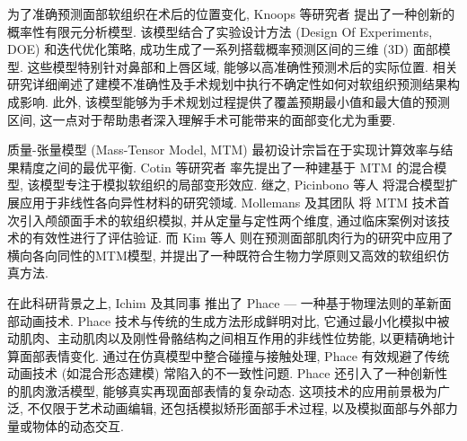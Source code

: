 为了准确预测面部软组织在术后的位置变化, Knoops 等研究者 \cite{knoopsNovelSoftTissue2018} 提出了一种创新的概率性有限元分析模型.
该模型结合了实验设计方法 (Design Of Experiments, DOE) 和迭代优化策略, 成功生成了一系列搭载概率预测区间的三维 (3D) 面部模型.
这些模型特别针对鼻部和上唇区域, 能够以高准确性预测术后的实际位置.
相关研究详细阐述了建模不准确性及手术规划中执行不确定性如何对软组织预测结果构成影响.
此外, 该模型能够为手术规划过程提供了覆盖预期最小值和最大值的预测区间, 这一点对于帮助患者深入理解手术可能带来的面部变化尤为重要.

质量-张量模型 (Mass-Tensor Model, MTM) 最初设计宗旨在于实现计算效率与结果精度之间的最优平衡.
Cotin 等研究者 \cite{cotinHybridElasticModel2000} 率先提出了一种建基于 MTM 的混合模型, 该模型专注于模拟软组织的局部变形效应.
继之, Picinbono 等人 \cite{picinbonoNonlinearAnisotropicElasticity2003} 将混合模型扩展应用于非线性各向异性材料的研究领域.
Mollemans 及其团队 \cite{mollemansPredictingSoftTissue2007} 将 MTM 技术首次引入颅颌面手术的软组织模拟, 并从定量与定性两个维度, 通过临床案例对该技术的有效性进行了评估验证.
而 Kim 等人 \cite{kimNewSofttissueSimulation2010} 则在预测面部肌肉行为的研究中应用了横向各向同性的MTM模型, 并提出了一种既符合生物力学原则又高效的软组织仿真方法.

在此科研背景之上, Ichim 及其同事 \cite{ichimPhacePhysicsbasedFace2017} 推出了 Phace --- 一种基于物理法则的革新面部动画技术.
Phace 技术与传统的生成方法形成鲜明对比, 它通过最小化模拟中被动肌肉、主动肌肉以及刚性骨骼结构之间相互作用的非线性位势能, 以更精确地计算面部表情变化.
通过在仿真模型中整合碰撞与接触处理, Phace 有效规避了传统动画技术 (如混合形态建模) 常陷入的不一致性问题.
Phace 还引入了一种创新性的肌肉激活模型, 能够真实再现面部表情的复杂动态.
这项技术的应用前景极为广泛, 不仅限于艺术动画编辑, 还包括模拟矫形面部手术过程, 以及模拟面部与外部力量或物体的动态交互.
